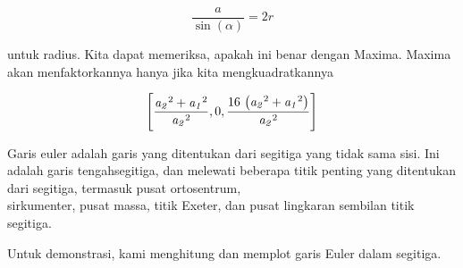 \documentclass[12pt,Times new roman,letterpaper]{book}
\begin{document}
\begin{eulernootebook}
\begin{eulercomment}
\begin{eulercomment}
\begin{eulernootebook}
\begin{eulercomment}
\begin{eulercomment}
\begin{eulercomment}
\begin{eulercomment}
\begin{eulercomment}
\begin{eulercomment}
\begin{eulernotebook}
\begin{eulercomment}
\begin{eulercomment}
\end{eulercomment}
\begin{eulerformula}
\[
\frac{a}{\sin(\alpha)}=2r
\]
\end{eulerformula}
\begin{eulercomment}
untuk radius. Kita dapat memeriksa, apakah ini benar dengan Maxima.
Maxima akan menfaktorkannya hanya jika kita mengkuadratkannya
\end{eulercomment}
\begin{eulerformula}
\[
\left[ \frac{{\it a_2}^2+{\it a_1}^2}{{\it a_2}^2} , 0 , \frac{16\,
 \left({\it a_2}^2+{\it a_1}^2\right)}{{\it a_2}^2} \right] 
\]
\end{eulerformula}
\begin{eulercomment}
Garis euler adalah garis yang ditentukan dari segitiga yang tidak sama
sisi. Ini adalah garis tengahsegitiga, dan melewati beberapa titik
penting yang ditentukan dari segitiga, termasuk pusat ortosentrum,\\
sirkumenter, pusat massa, titik Exeter, dan pusat lingkaran sembilan
titik segitiga.

Untuk demonstrasi, kami menghitung dan memplot garis Euler dalam
segitiga.


\end{eulercomment}
\end{eulercomment}
\end{eulernotebook}
\end{eulercomment}
\end{eulercomment}
\end{eulercomment}
\end{eulercomment}
\end{eulercomment}
\end{eulercomment}
\end{eulernootebook}
\end{eulercomment}
\end{eulercomment}
\end{eulernootebook}
\end{document}
